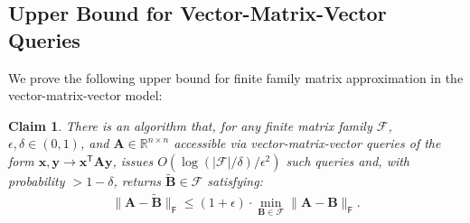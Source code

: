 \documentclass{article}[11pt]
\newtheorem{claim}{Claim}
\theoremstyle{definition}
\newcommand{\bv}[1]{\boldsymbol{\mathbf{#1}}}
\newcommand{\R}{\mathbb{R}}
\newcommand{\T}{\mathsf{T}}
\newcommand{\Fro}{\mathsf{F}}
\newcommand{\F}{\mathcal{F}}
\newcommand{\family}{\mathcal{F}}
\begin{document}
\subsection{Upper Bound for Vector-Matrix-Vector Queries}\label{sec:vmv}
We prove the following upper bound for finite family matrix approximation in the vector-matrix-vector model:
\begin{claim}
    \label{clm:vmv} 
    There is an algorithm that, for any finite matrix family $\mathcal{F}$, $\epsilon,\delta \in (0,1)$, and $\bv{A}\in \R^{n\times n}$ accessible via vector-matrix-vector queries of the form $\bv x,\bv y \rightarrow \bv x^\T \bv{A}\bv y$, issues $O(\log (|\F|/\delta)/\epsilon^2)$ such queries and, with probability $> 1-\delta$, returns $\bv{\tilde{B}}\in \mathcal{F}$ satisfying:
    \begin{align*}
    \|\bv{A} - \bv{\tilde{B}}\|_{\Fro} \leq (1+\epsilon) \cdot \min_{\bv{B}\in \family}\|\bv{A} - \bv{B}\|_{\Fro}.
    \end{align*}
    \end{claim}
\end{document}
